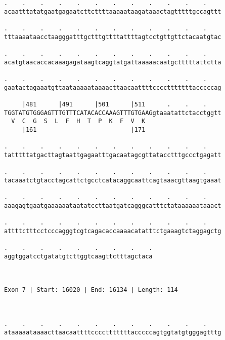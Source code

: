 \documentclass{article}
\begin{document}
\begin{Verbatim}
.    .    .    .    .    .    .    .    .    .    .    .    
acaatttatatgaatgagaatcttcttttaaaaataagataaactagtttttgccagttt
                                                            
.    .    .    .    .    .    .    .    .    .    .    .    
tttaaaataacctaagggatttgctttgttttattttagtcctgttgttctacaatgtac
                                                            
.    .    .    .    .    .    .    .    .    .    .    .    
acatgtaacaccacaaagagataagtcaggtatgattaaaaacaatgctttttattctta
                                                            
.    .    .    .    .    .    .    .    .    .    .    .    
gaatactagaaatgttaataaaaataaaacttaacaattttcccctttttttacccccag
                                                            
     |481      |491      |501      |511      .    .    .    
TGGTATGTGGGAGTTTGTTTCATACACCAAAGTTTGTGAAGgtaaatattctacctggtt
  V  C  G  S  L  F  H  T  P  K  F  V  K                     
     |161                          |171                     
  
.    .    .    .    .    .    .    .    .    .    .    .    
tatttttatgacttagtaattgagaatttgacaatagcgttatacctttgccctgagatt
                                                            
.    .    .    .    .    .    .    .    .    .    .    .    
tacaaatctgtacctagcattctgcctcatacaggcaattcagtaaacgttaagtgaaat
                                                            
.    .    .    .    .    .    .    .    .    .    .    .    
aaagagtgaatgaaaaaataatatccttaatgatcagggcatttctataaaaaataaact
                                                            
.    .    .    .    .    .    .    .    .    .    .    .    
attttctttcctcccagggtcgtcagacaccaaaacatatttctgaaagtctaggagctg
                                                            
.    .    .    .    .    .    .    .    .
aggtggatcctgatatgtcttggtcaagttctttagctaca
                                         
                                         
 
Exon 7 | Start: 16020 | End: 16134 | Length: 114



.    .    .    .    .    .    .    .    .    .    .    .    
ataaaaataaaacttaacaattttcccctttttttacccccagtggtatgtgggagtttg
                                                            

\end{Verbatim}
\end{document}
